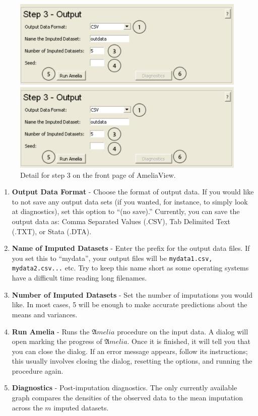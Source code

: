 \documentclass[12pt,titlepage]{article}
\begin{document}
\begin{figure}[ht]
  \centering 
  \begin{htmlonly} 
    \includegraphics[scale=1]{step3} 
  \end{htmlonly}
  \begin{latexonly}
    \includegraphics[scale=.75]{step3}
  \end{latexonly}
  \caption{Detail for step 3 on the front page of AmeliaView.}
\end{figure}
\begin{enumerate}
\item \textbf{Output Data Format} - Choose the format of output data.
  If you would like to not save any output data sets (if you wanted,
  for instance, to simply look at diagnostics), set this option to
  ``(no save).''  Currently, you can save the output data as: Comma
  Separated Values (.CSV), Tab Delimited Text (.TXT), or Stata (.DTA).
\item \textbf{Name of Imputed Datasets} - Enter the prefix for the
  output data files.  If you set this to ``mydata'', your output files
  will be \texttt{mydata1.csv, mydata2.csv...} etc.  Try to keep this
  name short as some operating systems have a difficult time reading
  long filenames.
\item \textbf{Number of Imputed Datasets} - Set the number of
  imputations you would like.  In most cases, 5 will be enough to make
  accurate predictions about the means and variances.
\item \textbf{Run Amelia} - Runs the ${\mathfrak Amelia}$ procedure on
  the input data.  A dialog will open marking the progress of
  ${\mathfrak Amelia}$.  Once it is finished, it will tell you that
  you can close the dialog.  If an error message appears, follow its
  instructions; this usually involves closing the dialog, resetting
  the options, and running the procedure again.
\item \textbf{Diagnostics} - Post-imputation diagnostics.  The only
  currently available graph compares the densities of the observed
  data to the mean imputation across the $m$ imputed datasets.
\end{enumerate}
\end{document}
